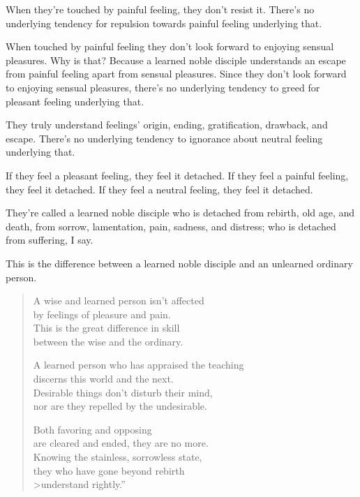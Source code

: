 \documentclass[12pt,openany]{book}%
\begin{document}
When they’re touched by painful feeling, they don’t resist it. There’s no underlying tendency for repulsion towards painful feeling underlying that. 

When touched by painful feeling they don’t look forward to enjoying sensual pleasures. Why is that? Because a learned noble disciple understands an escape from painful feeling apart from sensual pleasures. Since they don’t look forward to enjoying sensual pleasures, there’s no underlying tendency to greed for pleasant feeling underlying that. 

They truly understand feelings’ origin, ending, gratification, drawback, and escape. There’s no underlying tendency to ignorance about neutral feeling underlying that. 

If they feel a pleasant feeling, they feel it detached. If they feel a painful feeling, they feel it detached. If they feel a neutral feeling, they feel it detached. 

They’re called a learned noble disciple who is detached from rebirth, old age, and death, from sorrow, lamentation, pain, sadness, and distress; who is detached from suffering, I say. 

This is the difference between a learned noble disciple and an unlearned ordinary person. 

\begin{verse}%
A wise and learned person isn’t affected \\
by feelings of pleasure and pain. \\
This is the great difference in skill \\
between the wise and the ordinary. 

A learned person who has appraised the teaching \\
discerns this world and the next. \\
Desirable things don’t disturb their mind, \\
nor are they repelled by the undesirable. 

Both favoring and opposing \\
are cleared and ended, they are no more. \\
Knowing the stainless, sorrowless state, \\
they who have gone beyond rebirth \\>understand rightly.” 

%
\end{verse}
\end{document}
